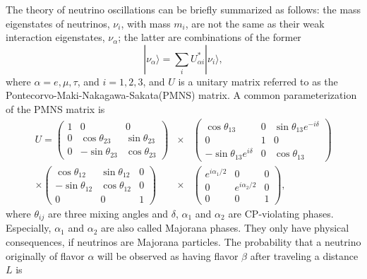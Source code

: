 The theory of neutrino oscillations can be briefly summarized as follows: the mass eigenstates of neutrinos, $\nu_{i}$, with mass $m_{i}$, are not the same as their weak interaction eigenstates, $\nu_{\alpha}$; the latter are combinations of the former
\begin{equation}
  \label{eq:osci}
  |\nu_{\alpha}\rangle=\sum_{i}U^{*}_{\alpha i}|\nu_{i}\rangle,
\end{equation}
where $\alpha=e,\mu,\tau$, and $i=1,2,3$, and $U$ is a unitary matrix referred to as the Pontecorvo-Maki-Nakagawa-Sakata(PMNS) matrix. A common parameterization of the PMNS matrix is
\begin{equation}
  \label{eq:pmns}
  \begin{array}{rcl}
    U = \left(\begin{array}{ccc}
        1 & 0 & 0 \\ 0 & \cos\theta_{23} & \sin\theta_{23} \\ 0 &         -\sin\theta_{23} & \cos\theta_{23}
      \end{array}\right) &\times&
    \left(\begin{array}{ccc}
        \cos\theta_{13} & 0 & \sin\theta_{13}e^{-i\delta} \\ 
        0 & 1 & 0 \\ -\sin\theta_{13}e^{i\delta} & 0 & \cos\theta_{13}
      \end{array}\right) \\ \times
    \left(\begin{array}{ccc}
        \cos\theta_{12} & \sin\theta_{12} & 0 \\ -\sin\theta_{12} &         \cos\theta_{12} & 0 \\ 0 & 0 & 1
      \end{array}\right) &\times&
    \left(\begin{array}{ccc}
        e^{i\alpha_1/2} & 0 & 0 \\ 0 & e^{i\alpha_2/2} & 0 \\ 0 & 0 & 1
      \end{array}\right),
  \end{array}
\end{equation}
where $\theta_{ij}$ are three mixing angles and $\delta$, $\alpha_1$ and $\alpha_2$ are CP-violating phases. Especially, $\alpha_1$ and $\alpha_2$ are also called Majorana phases. They only have physical consequences, if neutrinos are Majorana particles. The probability that a neutrino originally of flavor $\alpha$ will be observed as having flavor $\beta$ after traveling a distance $L$ is

